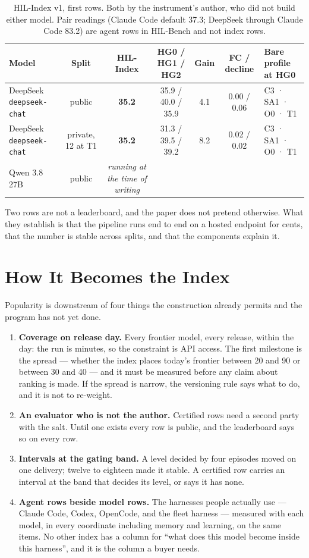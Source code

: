 \begin{table}[H]
\centering\small
\begin{tabularx}{\textwidth}{@{}lcccccY@{}}
\toprule
Model & Split & \textbf{HIL-Index} & HG0 / HG1 / HG2 & Gain & FC / decline & Bare profile at HG0 \\
\midrule
DeepSeek \texttt{deepseek-chat} & public & \textbf{35.2} & 35.9 / 40.0 / 35.9 & 4.1 & 0.00 / 0.06 & C3 · SA1 · O0 · T1 \\
DeepSeek \texttt{deepseek-chat} & private, 12 at T1 & \textbf{35.2} & 31.3 / 39.5 / 39.2 & 8.2 & 0.02 / 0.02 & C3 · SA1 · O0 · T1 \\
Qwen 3.8 27B & public & \emph{running at the time of writing} & & & & \\
\bottomrule
\end{tabularx}
\caption{HIL-Index v1, first rows. Both by the instrument's author, who did not build either model. Pair readings (Claude Code default 37.3; DeepSeek through Claude Code 83.2) are agent rows in HIL-Bench and not index rows.}
\label{tab:rows}
\end{table}

Two rows are not a leaderboard, and the paper does not pretend otherwise. What they establish is that the pipeline runs end to end on a hosted endpoint for cents, that the number is stable across splits, and that the components explain it.

\section{How It Becomes the Index}\label{sec:plan}

Popularity is downstream of four things the construction already permits and the program has not yet done.

\begin{enumerate}[leftmargin=*,itemsep=3pt]
\item \textbf{Coverage on release day.} Every frontier model, every release, within the day: the run is minutes, so the constraint is API access. The first milestone is the spread --- whether the index places today's frontier between 20 and 90 or between 30 and 40 --- and it must be measured before any claim about ranking is made. If the spread is narrow, the versioning rule says what to do, and it is not to re-weight.
\item \textbf{An evaluator who is not the author.} Certified rows need a second party with the salt. Until one exists every row is public, and the leaderboard says so on every row.
\item \textbf{Intervals at the gating band.} A level decided by four episodes moved on one delivery; twelve to eighteen made it stable. A certified row carries an interval at the band that decides its level, or says it has none.
\item \textbf{Agent rows beside model rows.} The harnesses people actually use --- Claude Code, Codex, OpenCode, and the fleet harness --- measured with each model, in every coordinate including memory and learning, on the same items. No other index has a column for ``what does this model become inside this harness'', and it is the column a buyer needs.
\end{enumerate}

